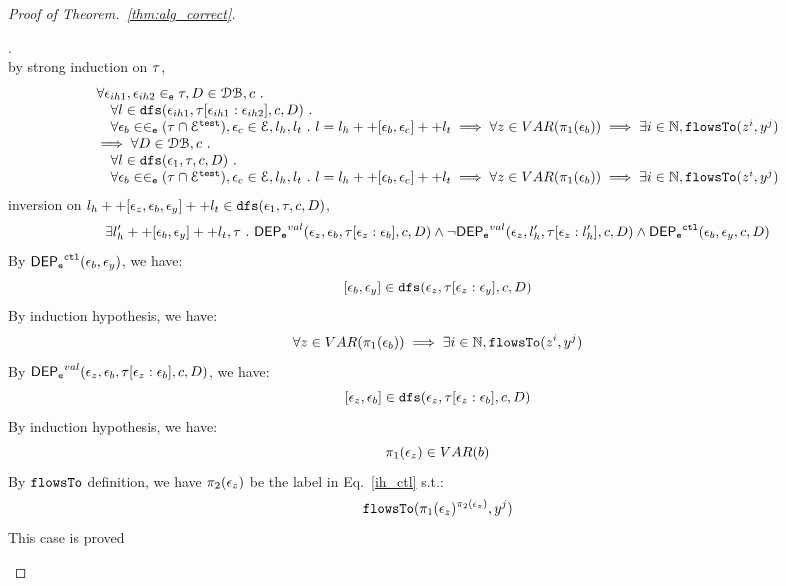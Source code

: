 \documentclass[a4paper,11pt]{article}
\begin{document}
\begin{proof}[Proof of Theorem.~\ref{thm:alg_correct}]
\begin{case}
\begin{subcase}
%
\end{subcase}
%
\begin{subcase}.
\\
by strong induction on $\mathtt{\tau}$,
\[
\begin{array}{l}
  \forall \mathtt{\epsilon}_{ih1}, \mathtt{\epsilon}_{ih2} \in_{\mathtt{e}} \mathtt{\tau}, D \in \mathcal{DB} , c ~.~
  \\ \quad 
   \forall l \in \mathtt{dfs}(\mathtt{\epsilon}_{ih1}, \mathtt{\tau}[\mathtt{\epsilon}_{ih1}:\mathtt{\epsilon}_{ih2}], c, D) ~.~
   \\ \quad 
   \forall \mathtt{\epsilon}_b \in \in_{\mathtt{e}} (\mathtt{\tau} \cap \mathcal{E}^{\mathtt{{test}}}), \mathtt{\epsilon}_c \in \mathcal{E}, l_h, l_t ~.~ 
   l = l_h ++ [ \mathtt{\epsilon}_b, \mathtt{\epsilon}_c] ++ l_t 
   \implies \forall z \in VAR(\pi_1(\mathtt{\epsilon}_b)) \implies \exists i \in \mathbb{N}, \mathtt{flowsTo}(z^i, y^j)
   \\
   \implies
   \forall D \in \mathcal{DB} , c ~.~
  \\ \quad 
   \forall l \in \mathtt{dfs}(\mathtt{\epsilon}_1, \mathtt{\tau}, c, D) ~.~
   \\ \quad 
   \forall \mathtt{\epsilon}_b \in \in_{\mathtt{e}} (\mathtt{\tau} \cap \mathcal{E}^{\mathtt{{test}}}), \mathtt{\epsilon}_c \in \mathcal{E}, l_h, l_t ~.~ 
   l = l_h ++ [ \mathtt{\epsilon}_b, \mathtt{\epsilon}_c] ++ l_t 
   \implies \forall z \in VAR(\pi_1(\mathtt{\epsilon}_b)) \implies \exists i \in \mathbb{N}, \mathtt{flowsTo}(z^i, y^j)
\end{array}
\]
inversion on  $l_h ++ {[\mathtt{\epsilon}_z,  \mathtt{\epsilon}_b, \mathtt{\epsilon}_y]} ++ l_t \in \mathtt{dfs}(\mathtt{\epsilon}_1, \mathtt{\tau}, c, D)$, 
\[
  \exists l_{h}' ++ [\mathtt{\epsilon}_b, \mathtt{\epsilon}_y] ++ l_t, \mathtt{\tau} ~.~
  \mathsf{DEP_{\mathtt{e}}}^{val}(\mathtt{\epsilon}_z, \mathtt{\epsilon}_b, \mathtt{\tau}[\mathtt{\epsilon}_z: \mathtt{\epsilon}_b], c, D)
  \land 
  \neg \mathsf{DEP_{\mathtt{e}}}^{val} (\mathtt{\epsilon}_z, l_h', \mathtt{\tau}[\mathtt{\epsilon}_z: l_h'], c, D)
  \land 
  \mathsf{DEP_{\mathtt{e}}}^{\mathtt{{ctl}}} (\mathtt{\epsilon}_b, \mathtt{\epsilon}_y, c, D)
\]
%
By $\mathsf{DEP_{\mathtt{e}}}^{\mathtt{{ctl}}} (\mathtt{\epsilon}_b, \mathtt{\epsilon}_y) $, we have:
\[
  [\mathtt{\epsilon}_b, \mathtt{\epsilon}_y]\in \mathtt{dfs}(\mathtt{\epsilon}_{z}, \mathtt{\tau}[\mathtt{\epsilon}_{z}:\mathtt{\epsilon}_{y}], c, D)
\]
%
By induction hypothesis, we have:
\begin{equation}
\label{ih_ctl}
  \forall z \in VAR(\pi_1(\mathtt{\epsilon}_b)) \implies \exists i \in \mathbb{N}, \mathtt{flowsTo}(z^i, y^j)
\end{equation}
%
By $\mathsf{DEP_{\mathtt{e}}}^{val}(\mathtt{\epsilon}_z, \mathtt{\epsilon}_b, \mathtt{\tau}[\mathtt{\epsilon}_z: \mathtt{\epsilon}_b], c, D)$, we have:
\[
  [\mathtt{\epsilon}_z, \mathtt{\epsilon}_b]\in \mathtt{dfs}(\mathtt{\epsilon}_{z}, \mathtt{\tau}[\mathtt{\epsilon}_{z}:\mathtt{\epsilon}_{b}], c, D)
\]
%
By induction hypothesis, we have:
\[
  \pi_1(\mathtt{\epsilon}_z) \in VAR(b)
\]
%
By $\mathtt{flowsTo}$ definition, we have $\pi_2(\mathtt{\epsilon}_z)$ be the label in Eq.~\ref{ih_ctl} s.t.:
\[
  \mathtt{flowsTo}(\pi_1(\mathtt{\epsilon}_z)^{\pi_2(\mathtt{\epsilon}_z)}, y^j)
\]
%
This case is proved
%
\completeness{
\\
}
\end{subcase}
\end{case}
\end{proof}
\end{document}
